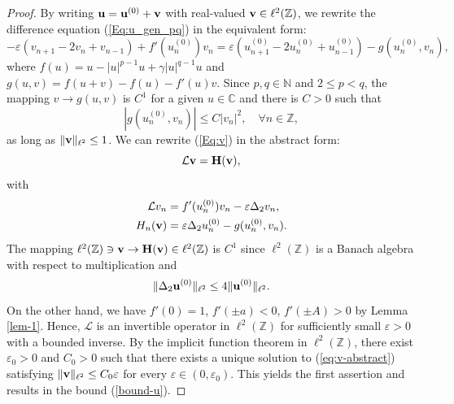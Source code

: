 \documentclass[10pt,a4paper]{amsart}
\begin{document}
\begin{proof}
	By writing ${\bf u} = {\bf u}^{(0)} + {\bf v}$ with real-valued ${\bf v} \in \ell^2(\mathbb{Z})$, we rewrite the difference 
	equation (\ref{Eq:u_gen_pq}) in the equivalent form:
\begin{equation}
-\varepsilon \left(v_{n+1}-2v_n+v_{n-1}\right) + f'(u_n^{(0)}) v_n = \varepsilon \left( u_{n+1}^{(0)} - 2 u_n^{(0)} + u_{n-1}^{(0)} \right) - g(u_n^{(0)},v_n),
\label{Eq:v}
\end{equation}	
where $f(u) = u - |u|^{p-1} u + \gamma |u|^{q-1} u$ and $g(u,v) =  f(u + v) - f(u) - f'(u) v$. Since $p,q \in \mathbb{N}$ and $2 \leq p < q$, the mapping $v \to g(u,v)$ is $C^1$ for a given $u \in \mathbb{C}$ and 
there is $C > 0$ such that 
$$
|g(u_n^{(0)},v_n)| \leq C|v_n|^2, \quad \forall n \in \mathbb{Z},
$$
as long as $\|{\bf v} \|_{\ell^2} \leq 1$. We can rewrite (\ref{Eq:v}) in the abstract form:
\begin{equation}
\label{eq:v-abstract}
\mathcal{L} {\bf v} = {\bf H}({\bf v}), 
\end{equation}
with 
\begin{align*}
\mathcal{L} v_n &= f'(u_n^{(0)}) v_n - \varepsilon \Delta_2 v_n, \\
H_n({\bf v}) &= \varepsilon \Delta_2 u_n^{(0)} - g(u_n^{(0)},v_n).
\end{align*}
The mapping $\ell^2(\mathbb{Z}) \ni {\bf v} \to {\bf H}({\bf v}) \in \ell^2(\mathbb{Z})$ is $C^1$ since $\ell^2(\mathbb{Z})$ is a Banach algebra with respect to multiplication and
$$
\| \Delta_2 {\bf u}^{(0)} \|_{\ell^2} \leq 4 \|{\bf  u}^{(0)} \|_{\ell^2}. 
$$
On the other hand, we have $f'(0) = 1$, $f'(\pm a) < 0$, $f'(\pm A) > 0$ by Lemma \ref{lem-1}. Hence, $\mathcal{L}$ is an invertible operator in $\ell^2(\mathbb{Z})$ for sufficiently small $\varepsilon > 0$ with a bounded inverse. By the implicit function theorem in $\ell^2(\mathbb{Z})$, there exist $\varepsilon_0 > 0$ and $C_0 > 0$ such that there exists a unique solution 
to (\ref{eq:v-abstract})  satisfying $\| {\bf v} \|_{\ell^2} \leq C_0 \varepsilon$ for every $\varepsilon \in (0,\varepsilon_0)$. This yields the first assertion and results in the bound (\ref{bound-u}). 


\end{proof}
\end{document}
